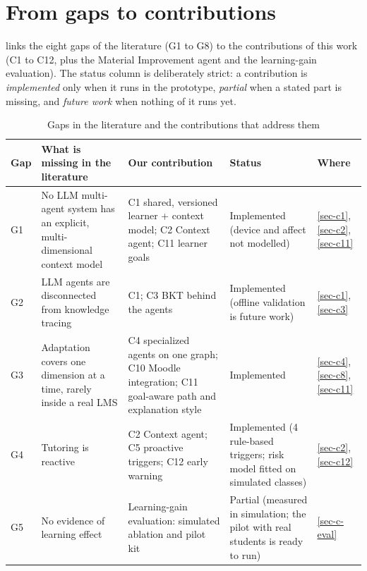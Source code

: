 \section{From gaps to contributions}
\label{sec-c-gaps}

 links the eight gaps of the literature
(G1 to G8) to the contributions of this work (C1 to C12, plus the
Material Improvement agent and the learning-gain evaluation). The status column
is deliberately strict: a contribution is \emph{implemented} only when it
runs in the prototype, \emph{partial} when a stated part is missing, and
\emph{future work} when nothing of it runs yet.

\begin{table}[htbp]
\centering
\caption{Gaps in the literature and the contributions that address them}
\label{tab-gaps-contributions}
\scriptsize
\begin{tabularx}{\textwidth}{@{}L{1.0cm}YL{3.0cm}L{2.6cm}L{1.3cm}@{}}
\toprule
\textbf{Gap} & \textbf{What is missing in the literature} & \textbf{Our contribution} &
  \textbf{Status} & \textbf{Where} \\
\midrule
G1 & No LLM multi-agent system has an explicit, multi-dimensional context model &
  C1 shared, versioned learner + context model; C2 Context agent; C11 learner goals &
  Implemented (device and affect not modelled) & \ref{sec-c1}, \ref{sec-c2}, \ref{sec-c11} \\
G2 & LLM agents are disconnected from knowledge tracing &
  C1; C3 BKT behind the agents & Implemented (offline validation is future work) &
  \ref{sec-c1}, \ref{sec-c3} \\
G3 & Adaptation covers one dimension at a time, rarely inside a real LMS &
  C4 specialized agents on one graph; C10 Moodle integration; C11 goal-aware path and
  explanation style &
  Implemented & \ref{sec-c4}, \ref{sec-c8}, \ref{sec-c11} \\
G4 & Tutoring is reactive & C2 Context agent; C5 proactive triggers; C12 early warning &
  Implemented (4 rule-based triggers; risk model fitted on simulated classes) &
  \ref{sec-c2}, \ref{sec-c12} \\
G5 & No evidence of learning effect & Learning-gain evaluation: simulated ablation and
  pilot kit &
  Partial (measured in simulation; the pilot with real students is ready to run) &
  \ref{sec-c-eval} \\

\end{tabularx}
\end{table}

